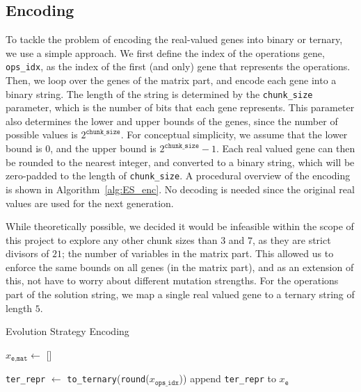 \documentclass{article}
\begin{document}
\subsection{Encoding}
\label{sec:ES_enc}
\vspace{-0.2cm}
To tackle the problem of encoding the real-valued genes into binary or ternary, we use a simple approach.
We first define the index of the operations gene, \texttt{ops\_idx}, as the index of the first (and only) gene that represents the operations.
Then, we loop over the genes of the matrix part, and encode each gene into a binary string.
The length of the string is determined by the \texttt{chunk\_size} parameter, which is the number of bits that each gene represents.
This parameter also determines the lower and upper bounds of the genes, since the number of possible values is $2^{\texttt{chunk\_size}}$.
For conceptual simplicity, we assume that the lower bound is 0, and the upper bound is $2^{\texttt{chunk\_size}}-1$.
Each real valued gene can then be rounded to the nearest integer, and converted to a binary string, which will be zero-padded to the length of \texttt{chunk\_size}.
A procedural overview of the encoding is shown in Algorithm~\ref{alg:ES_enc}.
No decoding is needed since the original real values are used for the next generation.

While theoretically possible, we decided it would be infeasible within the scope of this project to explore any other chunk sizes than $3$ and $7$, as they are strict divisors of $21$; the number of variables in the matrix part.
This allowed us to enforce the same bounds on all genes (in the matrix part), and as an extension of this, not have to worry about different mutation strengths.
For the operations part of the solution string, we map a single real valued gene to a ternary string of length $5$.

\vspace{-0.3cm}
\begin{algorithm}[htbp]

    \caption{Evolution Strategy Encoding}
    \label{alg:ES_enc}
    \SetAlgoLined
    \DontPrintSemicolon


    \BlankLine

    $x_{\texttt{e}, \texttt{mat}} \gets$ []\;

    \texttt{ter\_repr} $\gets$ \texttt{to\_ternary}(\texttt{round}($x_{\texttt{ops\_idx}}$))\;
    append \texttt{ter\_repr} to $x_\texttt{e}$\;

    \BlankLine


\end{algorithm}
\end{document}

